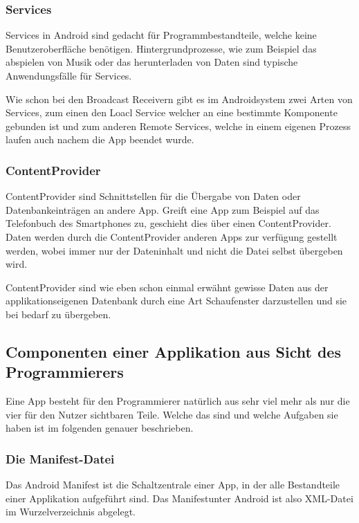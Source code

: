 \subsubsection{Services} \label{Services aus Nutzersicht}
Services in Android sind gedacht f\"ur Programmbestandteile, welche keine Benutzeroberfl\"ache ben\"otigen. Hintergrundprozesse, wie zum Beispiel das abspielen von Musik oder das herunterladen von Daten sind typische Anwendungsf\"alle f\"ur Services. 

Wie schon bei den Broadcast Receivern gibt es im Androidsystem zwei Arten von Services, zum einen den Loacl Service welcher an eine bestimmte Komponente gebunden ist und zum anderen Remote Services, welche in einem eigenen Prozess laufen auch nachem die App beendet wurde.

\subsubsection{ContentProvider} \label{ContentProvider aus Nutzersicht}
ContentProvider sind Schnittstellen f\"ur die \"Ubergabe von Daten oder Datenbankeintr\"agen an andere App.
Greift eine App zum Beispiel auf das Telefonbuch des Smartphones zu, geschieht dies \"uber einen ContentProvider. Daten werden durch die ContentProvider anderen Apps zur verf\"ugung gestellt werden, wobei immer nur der Dateninhalt und nicht die Datei selbst \"ubergeben wird. \cite{Kuehn12}

ContentProvider sind wie eben schon einmal erw\"ahnt gewisse Daten aus der applikationseigenen Datenbank durch eine Art Schaufenster darzustellen und sie bei bedarf zu \"ubergeben.

\subsection{Componenten einer Applikation aus Sicht des Programmierers}
Eine App besteht f\"ur den Programmierer nat\"urlich aus sehr viel mehr als nur die vier f\"ur den Nutzer sichtbaren Teile. Welche das sind und welche Aufgaben sie haben ist im folgenden genauer beschrieben.

\subsubsection{Die Manifest-Datei} \label{Die Manifest-Datei}
Das Android Manifest ist die Schaltzentrale einer App, in der alle Bestandteile einer Applikation aufgef\"uhrt sind. Das Manifestunter Android ist also XML-Datei im Wurzelverzeichnis abgelegt. 


